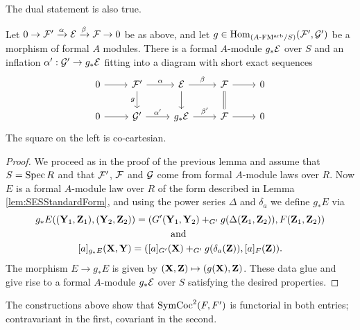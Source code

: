 \documentclass[../main.tex]{subfiles}
\begin{document}
The dual statement is also true. 
\begin{lem}
  Let $0 \to \mathcal{F}' \xrightarrow{\alpha} \mathcal{E} \xrightarrow{\beta} \mathcal{F} \to 0$ be as above, and let
  $g \in \operatorname{Hom}_{{({A}\textnormal-\allowbreak\mathrm{FM^{arb}}/{S})}}(\mathcal{F}', \mathcal{G}')$ be a morphism of formal 
  $A$ modules. There is a formal $A$-module $g_*\mathcal{E}$ over $S$ and an
  inflation $\alpha':\mathcal{G}' \to g_*\mathcal{E}$ fitting into a diagram with short 
  exact sequences
  \begin{equation*}
    \begin{tikzcd}[ampersand replacement=\&]
    	0 \& {\cF'} \& \cE \& \cF \& 0 \\
    	0 \& {\cG'} \& {g_* \cE} \& \cF \& 0
    	\arrow[from=1-1, to=1-2]
    	\arrow["\alpha", from=1-2, to=1-3]
    	\arrow["g"', from=1-2, to=2-2]
    	\arrow["\beta", from=1-3, to=1-4]
    	\arrow[from=1-3, to=2-3]
    	\arrow[from=1-4, to=1-5]
    	\arrow[Rightarrow, no head, from=1-4, to=2-4]
    	\arrow[from=2-1, to=2-2]
    	\arrow["{\alpha'}", from=2-2, to=2-3]
    	\arrow["{\beta'}", from=2-3, to=2-4]
    	\arrow[from=2-4, to=2-5]
    \end{tikzcd}
  \end{equation*}
  The square on the left is co-cartesian.
\begin{proof}
  We proceed as in the proof of the previous lemma and assume that 
  $S = \operatorname{Spec} R$ and that $\mathcal{F}'$, $\mathcal{F}$ and $\mathcal{G}$ come from formal $A$-module
  laws over $R$. Now $E$ is a formal $A$-module law over $R$ of the form 
  described in Lemma \ref{lem:SESStandardForm}, and 
  using the power series $\Delta$ and $\delta_a$ we define $g_* E$ via 
  \begin{gather*}
    g_*E((\mathbf{Y}_1, \mathbf{Z}_1), (\mathbf{Y}_2, \mathbf{Z}_2)) = (G'(\mathbf{Y}_1, \mathbf{Y}_2) +_{G'}
    g(\Delta(\mathbf{Z}_1, \mathbf{Z}_2)) , F(\mathbf{Z}_1, \mathbf{Z}_2)) \\
    \text{and } \\
    [a]_{g_*E}(\mathbf{X}, \mathbf{Y}) = ([a]_{G'}(\mathbf{X}) +_{G'} g(\delta_a(\mathbf{Z})), [a]_F(\mathbf{Z})).
  \end{gather*}
  The morphism $E \to g_*E$ is given by $(\mathbf{X}, \mathbf{Z}) \mapsto (g(\mathbf{X}), \mathbf{Z})$. 
  These data glue and give rise to a formal $A$-module
  $g_*\mathcal{E}$ over $S$ satisfying the desired properties.
\end{proof}
\end{lem}

\begin{rmk} 
  The constructions above show that $\operatorname{SymCoc}^2(F, F')$ is functorial in 
  both entries; contravariant in the first, covariant in the second.
\end{rmk}
\end{document}
